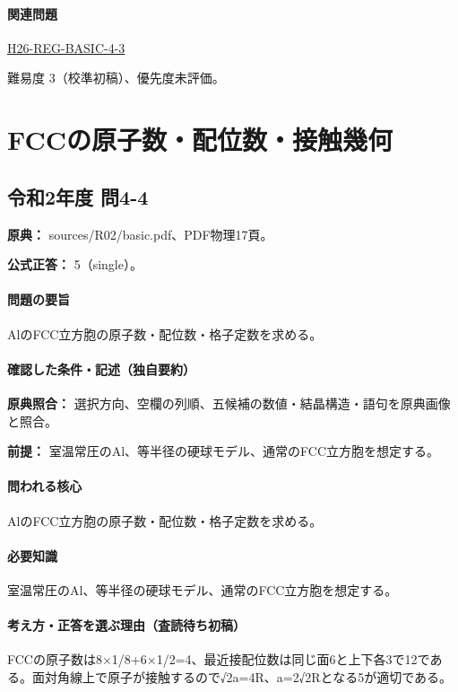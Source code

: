\paragraph{関連問題} \hyperref[q:h26-reg-basic-4-3]{H26-REG-BASIC-4-3}

\par 難易度 3（校準初稿）、優先度未評価。

\section{FCCの原子数・配位数・接触幾何}

\subsection{令和2年度 問4-4}
\label{q:r02-reg-basic-4-4}

\noindent\textbf{原典：} sources/R02/basic.pdf、PDF物理17頁。

\textbf{公式正答：} 5（single）。

\paragraph{問題の要旨} AlのFCC立方胞の原子数・配位数・格子定数を求める。

\paragraph{確認した条件・記述（独自要約）}\mbox{}\par

\noindent\textbf{原典照合：} 選択方向、空欄の列順、五候補の数値・結晶構造・語句を原典画像と照合。\par

\noindent\textbf{前提：} 室温常圧のAl、等半径の硬球モデル、通常のFCC立方胞を想定する。\par

\paragraph{問われる核心} AlのFCC立方胞の原子数・配位数・格子定数を求める。

\paragraph{必要知識} 室温常圧のAl、等半径の硬球モデル、通常のFCC立方胞を想定する。

\paragraph{考え方・正答を選ぶ理由（査読待ち初稿）} FCCの原子数は8×1/8+6×1/2=\allowbreak{}4、最近接配位数は同じ面6と上下各3で12である。面対角線上で原子が接触するので√2a=\allowbreak{}4R、a=\allowbreak{}2√2Rとなる5が適切である。

